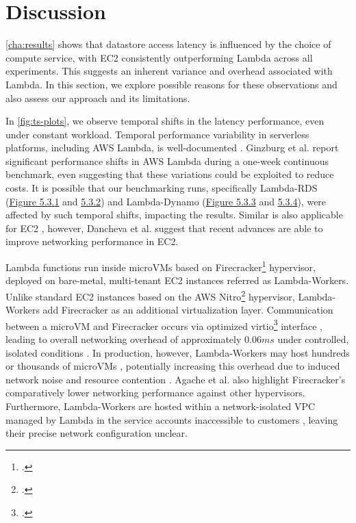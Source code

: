\section{Discussion}
\label{cha:discuss}

\cref{cha:results} shows that datastore access latency is influenced by the choice of compute service, with EC2 consistently outperforming Lambda across all experiments. This suggests an inherent variance and overhead associated with Lambda. In this section, we explore possible reasons for these observations and also assess our approach and its limitations.

In \cref{fig:ts-plots}, we observe temporal shifts in the latency performance, even under constant workload. Temporal performance variability in serverless platforms, including AWS Lambda, is well-documented \cite{paper_ginzburg_lambda_var,article_eismann_lambda_var,paper_schirmer_night_shift}. Ginzburg et al. \cite{paper_ginzburg_lambda_var} report significant performance shifts in AWS Lambda during a one-week continuous benchmark, even suggesting that these variations could be exploited to reduce costs. It is possible that our benchmarking runs, specifically Lambda-RDS (\hyperref[fig:ts_rds_const]{Figure 5.3.1} and \hyperref[fig:ts_rds_bursty]{5.3.2}) and Lambda-Dynamo (\hyperref[fig:ts_ddb_const]{Figure 5.3.3} and \hyperref[fig:ts_ddb_bursty]{ 5.3.4}), were affected by such temporal shifts, impacting the results. Similar is also applicable for EC2 \cite{paper_iosup_performance,article_schad_cloud_var}, however, Dancheva et al. \cite{article_dancheva_ec2_var} suggest that recent advances are able to improve networking performance in EC2.

Lambda functions run inside microVMs based on Firecracker\footcite{https://firecracker-microvm.github.io/} hypervisor, deployed on bare-metal, multi-tenant EC2 instances referred as Lambda-Workers. Unlike standard EC2 instances based on the AWS Nitro\footcite{https://aws.amazon.com/ec2/nitro/} hypervisor, Lambda-Workers add Firecracker as an additional virtualization layer. Communication between a microVM and Firecracker occurs via optimized virtio\footcite{https://libvirt.org/} interface \cite{paper_brooker_lambda}, leading to overall networking overhead of approximately $0.06ms$ under controlled, isolated conditions \cite{repo_firecracker}. In production, however, Lambda-Workers may host hundreds or thousands of microVMs \cite{paper_agache_firecracker}, potentially increasing this overhead due to induced network noise and resource contention \cite{article_desensi_noise,paper_wang_faas_bts}. Agache et al. \cite{paper_agache_firecracker} also highlight Firecracker's comparatively lower networking performance against other hypervisors. Furthermore, Lambda-Workers are hosted within a network-isolated VPC managed by Lambda in the service accounts inaccessible to customers \cite{web_aws_lambda_security}, leaving their precise network configuration unclear.


